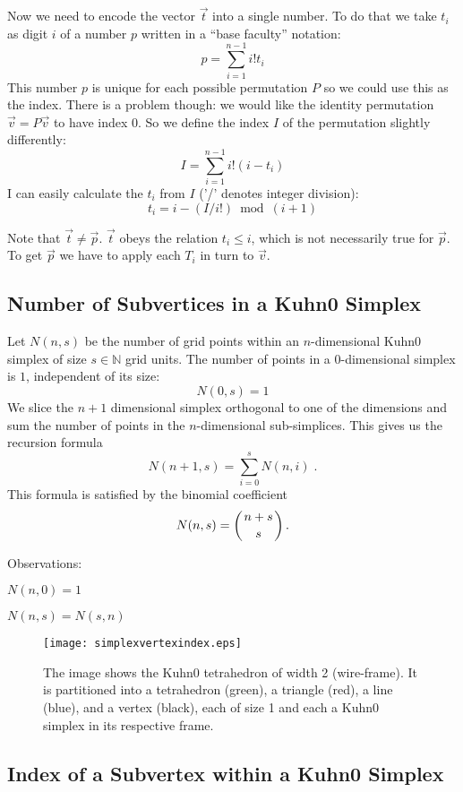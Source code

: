 \documentclass[english,a4paper]{article}
\begin{document}
Now we need to encode the vector $\vec{t}$ into a single number.  To
do that we take $t_i$ as digit $i$ of a number $p$ written in a ``base
faculty'' notation:
\[p=\sum_{i=1}^{n-1}i!t_i\]
This number $p$ is unique for each possible permutation $P$ so we
could use this as the index.  There is a problem though: we would like
the identity permutation $\vec{v}=P\vec{v}$ to have index 0.  So we
define the index $I$ of the permutation slightly differently:
\[I=\sum_{i=1}^{n-1}i!(i-t_i)\]
I can easily calculate the $t_i$ from $I$ ('/' denotes integer
division):
\[t_i=i-(I/i!)\bmod{(i+1)}\]

Note that $\vec{t}\not=\vec{p}$.  $\vec{t}$ obeys the relation
$t_i\leq i$, which is not necessarily true for $\vec{p}$.  To get
$\vec{p}$ we have to apply each $T_i$ in turn to $\vec{v}$.

\subsection{Number of Subvertices in a Kuhn0 Simplex}

Let $N(n,s)$ be the number of grid points within an $n$-dimensional
Kuhn0 simplex of size $s\in\mathbb{N}$ grid units.
The number of points in a $0$-dimensional simplex is $1$, independent of
its size:
\[N(0,s)=1\]
We slice the $n+1$ dimensional simplex orthogonal to one of the
dimensions and sum the number of points in the $n$-dimensional
sub-simplices.  This gives us the recursion formula
\[N(n+1,s)=\sum^s_{i=0}N(n,i)\;.\]
This formula is satisfied by the binomial coefficient\cite{bronstein}
\[N(n,s)=\left({n+s}\atop s\right).\]

Observations:
\begin{compactitem}
\item $N(n,0)=1$
\item $N(n,s)=N(s,n)$
\end{compactitem}

\begin{figure}
  \centering
  \texttt{[image: simplexvertexindex.eps]}
  \caption{\label{simplexindex}The image shows the Kuhn0 tetrahedron
    of width 2 (wire-frame).  It is partitioned into a tetrahedron
    (green), a triangle (red), a line (blue), and a vertex (black),
    each of size 1 and each a Kuhn0 simplex in its respective frame.}
\end{figure}

\subsection{Index of a Subvertex within a Kuhn0 Simplex}
\end{document}
